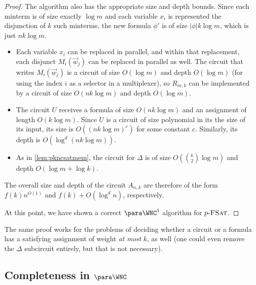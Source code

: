 \begin{proof}
  The algorithm also has the appropriate size and depth bounds.
  Since each minterm is of size exactly $\log m$ and each variable $x_i$ is represented the disjunction of $k$ such minterms, the new formula $\phi'$ is of size $|\phi| k \log m$, which is just $n k \log m$.
  \begin{itemize}
  \item
    Each variable $x_i$ can be replaced in parallel, and within that replacement, each disjunct $M_i(\vec{w}_j)$ can be replaced in parallel as well.
    The circuit that writes $M_i(\vec{w}_j)$ is a circuit of size $O(\log m)$ and depth $O(\log m)$ (for using the index $i$ as a selector in a multiplexer), so $R_{m, k}$ can be implemented by a circuit of size $O(n k \log m)$ and depth $O(\log m)$.
  \item
    The circuit $U$ receives a formula of size $O(n k \log m)$ and an assignment of length $O(k \log m)$.
    Since $U$ is a circuit of size polynomial in its the size of its input, its size is $O((n k \log m)^c)$ for some constant $c$.
    Similarly, its depth is $O(\log^d (n k \log m))$.
  \item As in \autoref{lem:pkncsatmem}, the circuit for $\Delta$ is of size $O(\binom{k}{2} \log m)$ and depth $O(\log m + \log k)$.
  \end{itemize}
  The overall size and depth of the circuit $A_{n, k}$ are therefore of the form $f(k) n^{O(1)}$ and $f(k) + O(\log^d n)$, respectively.

  At this point, we have shown a correct $\para \WNC^1$ algorithm for $p \textnormal{-} \textsc{FSat}$.
\end{proof}

The same proof works for the problems of deciding whether a circuit or a formula has a satisfying assignment of weight \emph{at most} $k$, as well (one could even remove the $\Delta$ subcircuit entirely, but that is not necessary).

\subsection{Completeness in \texorpdfstring{$\para \WNC$}{paraWNC}}
\label{sec:parawnccompleteness}

